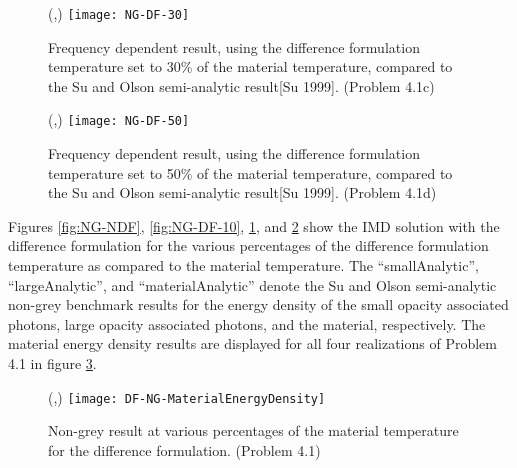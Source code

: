 \begin{figure}[htbp]
	\begin{center}
		\begin{minipage}[t]{6in}
		\centering
		\begin{picture}(\width,\height)
	                {\texttt{[image: NG-DF-30]}}
		\end{picture}
		\caption{\label{fig:NG-DF-30} Frequency dependent result, using the difference formulation temperature set to 30\% of the material temperature, compared to the Su and Olson semi-analytic result[Su 1999]. (Problem 4.1c) }
		\end{minipage} %
	\end{center}
\end{figure}

\begin{figure}[htbp]
	\begin{center}
		\begin{minipage}[t]{6in}
		\centering
		\begin{picture}(\width,\height)
	                {\texttt{[image: NG-DF-50]}}
		\end{picture}
		\caption{\label{fig:NG-DF-50} Frequency dependent result, using the difference formulation temperature set to 50\% of the material temperature, compared to the Su and Olson semi-analytic result[Su 1999]. (Problem 4.1d) }
		\end{minipage} %
	\end{center}
\end{figure}

	Figures \ref{fig:NG-NDF}, \ref{fig:NG-DF-10}, \ref{fig:NG-DF-30}, and \ref{fig:NG-DF-50} show the IMD solution with the difference formulation for the various percentages of the difference formulation temperature as compared to the material temperature. The ``smallAnalytic'', ``largeAnalytic'', and ``materialAnalytic'' denote the Su and Olson semi-analytic non-grey benchmark results for the energy density of the small opacity associated photons, large opacity associated photons, and the material, respectively. The material energy density results are displayed for all four realizations of Problem 4.1 in figure \ref{fig:DF-NG-MaterialEnergyDensity}.

\begin{figure}[htbp]
	\begin{center}
		\begin{minipage}[t]{6in}
		\centering
		\begin{picture}(\width,\height)
	                {\texttt{[image: DF-NG-MaterialEnergyDensity]}}
		\end{picture}
		\caption{\label{fig:DF-NG-MaterialEnergyDensity} Non-grey result at various percentages of the material temperature for the difference formulation. (Problem 4.1)}
		\end{minipage} %
	\end{center}
\end{figure}


